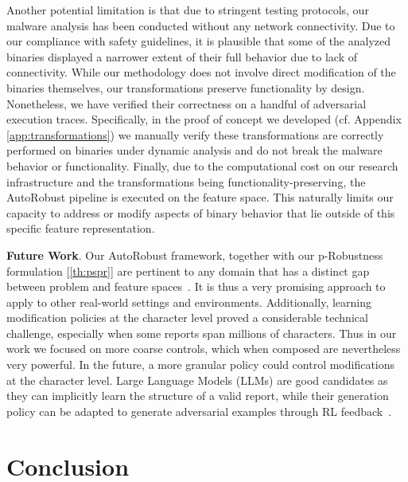 Another potential limitation is that due to stringent testing protocols, our malware analysis has been conducted without any network connectivity.
Due to our compliance with safety guidelines, it is plausible that some of the analyzed binaries displayed a narrower extent of their full behavior due to lack of connectivity.
While our methodology does not involve direct modification of the binaries themselves, our transformations preserve functionality by design.
Nonetheless, we have verified their correctness on a handful of adversarial execution traces.
Specifically, in the proof of concept we developed (cf. Appendix \ref{app:transformations}) we manually verify these transformations are correctly performed on binaries under dynamic analysis and do not break the malware behavior or functionality.
Finally, due to the computational cost on our research infrastructure and the transformations being functionality-preserving, the AutoRobust pipeline is executed on the feature space.
This naturally limits our capacity to address or modify aspects of binary behavior that lie outside of this specific feature representation.

\textbf{Future Work}. Our AutoRobust framework, together with our p-Robustness formulation [\ref{th:pspr}] are pertinent to any domain that has a distinct gap between problem and feature spaces~\cite{dyrmishi2023empirical}.
It is thus a very promising approach to apply to other real-world settings and environments.
Additionally, learning modification policies at the character level proved a considerable technical challenge, especially when some reports span millions of characters.
Thus in our work we focused on more coarse controls, which when composed are nevertheless very powerful.
In the future, a more granular policy could control modifications at the character level.
Large Language Models (LLMs) are good candidates as they can implicitly learn the structure of a valid report, while their generation policy can be adapted to generate adversarial examples through \gls{RL} feedback~\cite{christiano2017deep}.

\section{Conclusion}

